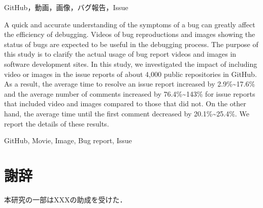 \documentclass[paper, technicalreport]{ieicej}
\begin{document}
\begin{abstract}
    バグの症状の迅速で的確な把握は，デバッグ作業の効率に大きく影響する．
    バグの再現動画やバグの状況を表す画像は，デバッグ作業に有用であると期待できる．
    本研究の目的は，ソフトウェア開発現場におけるバグ報告動画及び画像の活用実態を明らかにすることである．
    GitHubで公開されている約4,000件のリポジトリを対象に，課題報告（Issueレポート）において動画及び画像の有無による影響を調査した．
    その結果として，動画及び画像が含まれる課題報告は，そうでないものに比べて，課題報告が解決するまでの時間が平均で，2.9\%\textasciitilde17.6\%増加し，
    またコメント数が平均で76.4\%\textasciitilde143\%増加した．
    一方で，最初のコメントがつくまでの時間が平均で20.1\%\textasciitilde25.4\%減少した．
    これらの結果の詳細について報告する．
\end{abstract}

\begin{keyword}
    GitHub，動画，画像，バグ報告，Issue
\end{keyword}

\begin{eabstract}
    A quick and accurate understanding of the symptoms of a bug can greatly affect the efficiency of debugging.
    Videos of bug reproductions and images showing the status of bugs are expected to be useful in the debugging process.
    The purpose of this study is to clarify the actual usage of bug report videos and images in software development sites.
    In this study, we investigated the impact of including video or images in the issue reports of about 4,000 public repositories in GitHub.
    As a result, the average time to resolve an issue report increased by 2.9\%\textasciitilde17.6\% 
    and the average number of comments increased by 76.4\%\textasciitilde143\% for issue reports that included video and images compared to those that did not.
    On the other hand, the average time until the first comment decreased by 20.1\%\textasciitilde25.4\%.
    We report the details of these results.
\end{eabstract}

\begin{ekeyword}
    GitHub, Movie, Image, Bug report, Issue
\end{ekeyword}


\maketitle

{\large








}

\section*{謝辞}
本研究の一部はXXXの助成を受けた．

%
%



\end{document}
